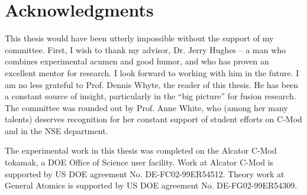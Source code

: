 
\chapter*{Acknowledgments}


This thesis would have been utterly impossible without the support of my committee.  First, I wish to thank my advisor, Dr. Jerry Hughes -- a man who combines experimental acumen and good humor, and who has proven an excellent mentor for research.  I look forward to working with him in the future.  I am no less grateful to Prof. Dennis Whyte, the reader of this thesis.  He has been a constant source of insight, particularly in the ``big picture'' for fusion research.  The committee was rounded out by Prof. Anne White, who (among her many talents) deserves recognition for her constant support of student efforts on C-Mod and in the NSE department.

The experimental work in this thesis was completed on the Alcator C-Mod tokamak, a DOE Office of Science user facility.  Work at Alcator C-Mod is supported by US DOE agreement No. DE-FC02-99ER54512.  Theory work at General Atomics is supported by US DOE agreement No. DE-FG02-99ER54309.